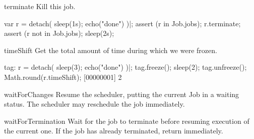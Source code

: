 \begin{urbiscriptapi}
\item[terminate]  Kill this job.
\begin{urbiscript}
var r = detach({ sleep(1s); echo("done") })|;
assert (r in Job.jobs);
r.terminate;
assert (r not in Job.jobs);
sleep(2s);
\end{urbiscript}

\item[timeShift]
  Get the total amount of time during which we were frozen.
\begin{urbiscript}
tag: r = detach({ sleep(3); echo("done") })|;
tag.freeze();
sleep(2);
tag.unfreeze();
Math.round(r.timeShift);
[00000001] 2
\end{urbiscript}

\item[waitForChanges] Resume the scheduler, putting the current Job in a
  waiting status.  The scheduler may reschedule the job immediately.

\item[waitForTermination] Wait for the job to terminate before resuming
  execution of the current one.  If the job has already terminated, return
  immediately.
\end{urbiscriptapi}



